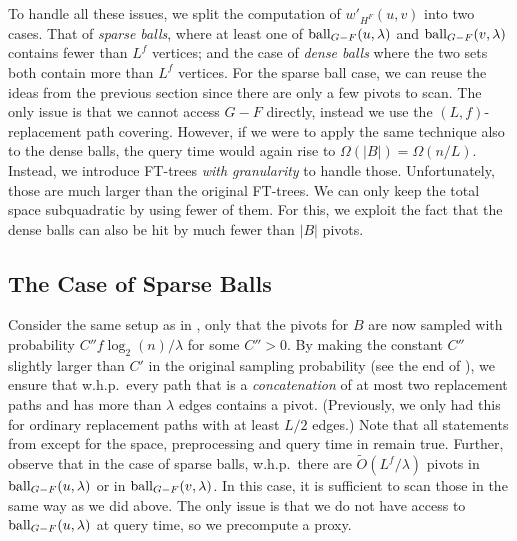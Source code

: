 \documentclass{theoretics}
\newcommand*{\Otilde}{\widetilde{O}}
\newcommand*{\ball}{\mbox{\rm ball}}
\begin{document}
To handle all these issues, we split the computation of $w'_{H^F}(u,v)$ into two cases. 
That of \emph{sparse balls}, where at least one of $\ball_{G-F}(u,\lambda)$ and $\ball_{G-F}(v,\lambda)$ contains fewer than $L^f$ vertices;
and the case of \emph{dense balls} where the two sets both contain more than $L^f$ vertices.
For the sparse ball case, we can reuse the ideas from the previous section
since there are only a few pivots to scan.
The only issue is that we cannot access $G-F$ directly,
instead we use the $(L,f)$-replacement path covering.
However, if we were to apply the same technique also to the dense balls,
the query time would again rise to $\Omega(|B|) = \Omega(n/L)$.
Instead, we introduce FT-trees \emph{with granularity} to handle those.
Unfortunately, those are much larger than the original FT-trees.
We can only keep the total space subquadratic by using fewer of them.
For this, we exploit the fact that the dense balls can also be hit by much fewer than $|B|$ pivots.


\subsection{The Case of Sparse Balls}
\label{subsec:improved_query_sparse}

Consider the same setup as in ,
only that the pivots for $B$ are now sampled with probability $C'' f \log_2(n)/\lambda$
for some $C'' > 0$.
By making the constant $C''$ slightly larger than $C'$ in the original sampling probability
(see the end of ),
we ensure that w.h.p.\ every path that is a \emph{concatenation} of at most two
replacement paths and has more than $\lambda$ edges contains a pivot.
(Previously, we only had this for ordinary replacement paths with at least $L/2$ edges.)
Note that all statements from 
except for the space, preprocessing and query time in  remain true.
Further, observe that in the case of sparse balls, w.h.p.\ there are $\Otilde(L^{f}/\lambda)$ pivots in 
$\ball_{G-F}(u,\lambda)$ or in $\ball_{G-F}(v,\lambda)$.
In this case, it is sufficient to scan those in the same way as we did above.
The only issue is that we do not have access to $\ball_{G-F}(u,\lambda)$ at query time,
so we precompute a proxy.
\end{document}
